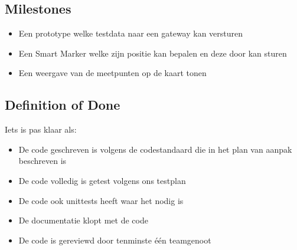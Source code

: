 \newpage
\subsection{Milestones}
\begin{itemize}
    \item Een prototype welke testdata naar een gateway kan versturen
    \item Een Smart Marker welke zijn positie kan bepalen en deze door kan sturen
    \item Een weergave van de meetpunten op de kaart tonen
\end{itemize}
\subsection{Definition of Done}
Iets is pas klaar als:
\begin{itemize}
    \item De code geschreven is volgens de codestandaard die in het plan
          van aanpak beschreven is\
    \item De code volledig is getest volgens ons testplan
    \item De code ook unittests heeft waar het nodig is
    \item De documentatie klopt met de code
    \item De code is gereviewd door tenminste één teamgenoot
\end{itemize}
